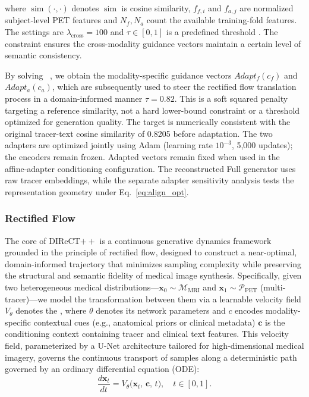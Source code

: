 \documentclass{article}
\providecommand{\DIFaddtex}[1]{{\protect\color{blue} \sf #1}} %
\providecommand{\DIFdeltex}[1]{{\protect\color{red} \scriptsize #1}} %
\providecommand{\DIFaddbegin}{} %
\providecommand{\DIFaddend}{} %
\providecommand{\DIFdelbegin}{} %
\providecommand{\DIFdelend}{} %
\providecommand{\DIFadd}[1]{\texorpdfstring{\DIFaddtex{#1}}{#1}} %
\providecommand{\DIFdel}[1]{\texorpdfstring{\DIFdeltex{#1}}{}} %
\newcommand{\DIFscaledelfig}{0.5}
\newlength{\DIFdelgraphicswidth} %
\newlength{\DIFdelgraphicsheight} %
\newcommand{\DIFaddincludegraphics}[2][]{{\color{blue}\fbox{\DIFOincludegraphics[#1]{#2}}}} %
\newcommand{\DIFdelincludegraphics}[2][]{%
\sbox{\DIFdelgraphicsbox}{\DIFOincludegraphics[#1]{#2}}%
\settoboxwidth{\DIFdelgraphicswidth}{\DIFdelgraphicsbox} %
\settoboxtotalheight{\DIFdelgraphicsheight}{\DIFdelgraphicsbox} %
\scalebox{\DIFscaledelfig}{%
\parbox[b]{\DIFdelgraphicswidth}{\usebox{\DIFdelgraphicsbox}\\[-\baselineskip] \rule{\DIFdelgraphicswidth}{0em}}\llap{\resizebox{\DIFdelgraphicswidth}{\DIFdelgraphicsheight}{%
\setlength{\unitlength}{\DIFdelgraphicswidth}%
\begin{picture}(1,1)%
\thicklines\linethickness{2pt} %
{\color[rgb]{1,0,0}\put(0,0){\framebox(1,1){}}}%
{\color[rgb]{1,0,0}\put(0,0){\line( 1,1){1}}}%
{\color[rgb]{1,0,0}\put(0,1){\line(1,-1){1}}}%
\end{picture}%
}\hspace*{3pt}}} %
} %
\DeclareRobustCommand{\DIFaddbegin}{\DIFOaddbegin \let\includegraphics\DIFaddincludegraphics} %
\DeclareRobustCommand{\DIFaddend}{\DIFOaddend \let\includegraphics\DIFOincludegraphics} %
\DeclareRobustCommand{\DIFdelbegin}{\DIFOdelbegin \let\includegraphics\DIFdelincludegraphics} %
\DeclareRobustCommand{\DIFdelend}{\DIFOaddend \let\includegraphics\DIFOincludegraphics} %
\begin{document}
where \DIFdelbegin \DIFdel{$\operatorname{sim}(\cdot, \cdot)$ denotes }\DIFdelend \DIFaddbegin \DIFadd{$\operatorname{sim}$ is }\DIFaddend cosine similarity, \DIFaddbegin \DIFadd{$f_{f,i}$ and $f_{a,j}$ are normalized subject-level PET features and $N_f,N_a$ count the available training-fold features. The settings are $\lambda_{\mathrm{cross}}=100$ }\DIFaddend and \DIFdelbegin \DIFdel{$\tau \in [0,1]$ is a predefined threshold . The constraint ensures the cross-modality guidance vectors maintain a certain level of semantic consistency. }%

\DIFdel{By solving~}%
\DIFdel{, we obtain the modality-specific guidance vectors $Adapt_f(c_f)$ and $Adapt_a(c_a)$, which are subsequently used to steer the rectified flow translation process in a domain-informed manner}\DIFdelend \DIFaddbegin \DIFadd{$\tau=0.82$. This is a soft squared penalty targeting a reference similarity, not a hard lower-bound constraint or a threshold optimized for generation quality. The target is numerically consistent with the original tracer-text cosine similarity of 0.8205 before adaptation. The two adapters are optimized jointly using Adam (learning rate $10^{-3}$, 5,000 updates); the encoders remain frozen. Adapted vectors remain fixed when used in the affine-adapter conditioning configuration. The reconstructed Full generator uses raw tracer embeddings, while the separate adapter sensitivity analysis tests the representation geometry under Eq.~}\eqref{eq:align_opt}\DIFaddend .


\subsubsection{Rectified Flow}
The core of DIReCT$++$ is a continuous generative dynamics framework grounded in the principle of rectified flow, designed to construct a near-optimal, domain-informed trajectory that minimizes sampling complexity while preserving the structural and semantic fidelity of medical image synthesis. Specifically, given two heterogeneous medical distributions---$\mathbf{x}_0 \sim \mathcal{M}_{\text{MRI}}$ and $\mathbf{x}_1 \sim \mathcal{P}_{\text{PET}}$ (multi-tracer)---we model the transformation between them via a learnable velocity field $V_\theta$\DIFdelbegin \DIFdel{denotes the }\DIFdelend \DIFaddbegin \DIFadd{, where $\theta$ denotes its }\DIFaddend network parameters and \DIFdelbegin \DIFdel{$c$ encodes modality-specific contextual cues (e.g., anatomical priors or clinical metadata)}\DIFdelend \DIFaddbegin \DIFadd{$\mathbf{c}$ is the conditioning context containing tracer and clinical text features}\DIFaddend . This velocity field, parameterized by a U-Net architecture tailored for high-dimensional medical imagery, governs the continuous transport of samples along a deterministic path governed by an ordinary differential equation (ODE):
\begin{equation}
\frac{d\mathbf{x}_t}{dt} = V_\theta\big(\mathbf{x}_t,\, \mathbf{c},\, t\big), \quad t \in [0, 1].
\label{eq:rf_ode}
\end{equation}
\end{document}
